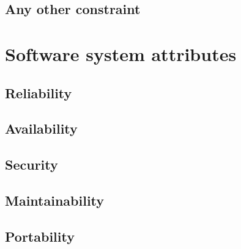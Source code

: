 \subsection{Any other constraint}

\section{Software system attributes}
\subsection{Reliability}
\subsection{Availability}
\subsection{Security}
\subsection{Maintainability}
\subsection{Portability}